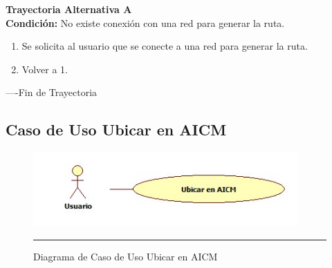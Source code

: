 \begin{flushleft}
	\hypertarget{TrayectoriaA_CU-U-08}{}
	\textbf{Trayectoria Alternativa A}\\
	\textbf{Condición:} No existe conexión con una red para generar la ruta. \\
	\begin{enumerate}
		\item Se solicita al usuario que se conecte a una red para generar la ruta. 
		\item Volver a 1.
	\end{enumerate}
\end{flushleft}
----Fin de Trayectoria
\clearpage

\subsection{Caso de Uso Ubicar en AICM}

\begin{figure}[htbp]
	\centering
		\includegraphics[width=0.9\textwidth]{Figuras/cuUbicarAICM.jpg}
		\rule{30em}{0.5pt}
	\caption[Diagrama de Caso de Uso Ubicar en AICM]{Diagrama de Caso de Uso Ubicar en AICM}
	\label{fig:cuUbicarAICM}
\end{figure}


